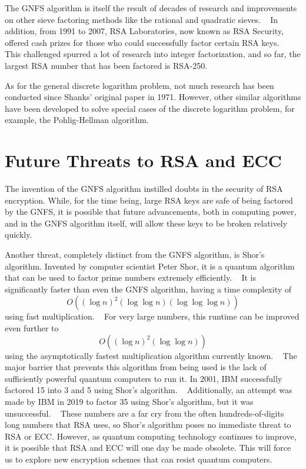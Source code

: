 \documentclass[letterpaper,twocolumn,12pt]{article}
\newcommand{\parens}[1]{\left( #1 \right)}
\begin{document}
    The GNFS algorithm is itself the result of decades of research and
    improvements on other sieve
    factoring methods like the rational and quadratic sieves.
    ~\cite{TOTS}
    In addition, from 1991 to 2007, RSA Laboratories, now known as RSA
    Security, offered cash prizes for those who could successfully factor
    certain RSA keys.
    ~\cite{RSAChallenge}
    This challenged spurred a lot of research into integer factorization,
    and so far, the largest RSA number that has been factored is RSA-250.
    ~\cite{RSA250}

    As for the general discrete logarithm problem, not much research has been
    conducted
    since Shanks' original paper in 1971. However, other similar algorithms have
    been developed to solve special cases of the discrete logarithm problem,
    for example, the Pohlig-Hellman algorithm.
    ~\cite{PHA}

    \section*{Future Threats to RSA and ECC}

    The invention of the GNFS algorithm instilled doubts in the security of RSA
    encryption.
    While, for the time being, large RSA keys are safe of being
    factored by the GNFS, it is possible that future advancements, both in
    computing power, and in the GNFS algorithm itself, will allow these keys to
    be broken relatively quickly.

    Another threat, completely distinct from the GNFS algorithm, is Shor's
    algorithm.
    Invented by computer scientist Peter Shor, it is a quantum algorithm that
    can be used to factor prime numbers extremely efficiently.
    ~\cite{QC:Shors}
    It is significantly faster than even the GNFS algorithm, having a time
    complexity of
    \[ O\parens{ (\log n)^2(\log\log n)(\log\log\log n) } \]
    using fast multiplication.
    ~\cite{ShorsTime}
    For very large numbers, this runtime can be improved even further to
    \[ O\parens{ (\log n)^2(\log\log n)} \]
    using the asymptotically fastest multiplication algorithm currently known.
    ~\cite{FastMult}
    The major barrier that prevents this algorithm from being used is the lack
    of sufficiently powerful quantum computers to run it.
    In 2001, IBM successfully factored 15 into 3 and 5 using Shor's algorithm.
    ~\cite{2001IBM}
    Additionally, an attempt was made by IBM in 2019 to factor 35 using Shor's
    algorithm, but it was unsuccessful.
    ~\cite{Failed}
    These numbers are a far cry from the often hundreds-of-digits long numbers
    that RSA uses, so Shor's algorithm poses no immediate threat to RSA or ECC.
    However, as quantum
    computing technology continues to improve, it is possible that RSA and ECC
    will one day be made obsolete. This will 
    force us to explore new encryption schemes that can resist quantum computers.
    
\end{document}
